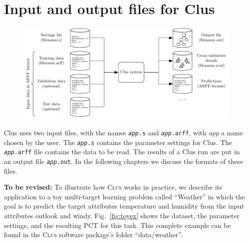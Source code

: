 \documentclass[a4paper]{report}
\newcommand{\clus}{\textsc{Clus}}
\begin{document}
\section{Input and output files for Clus}

\begin{figure}
\includegraphics{fig/clusinout}
\end{figure}

Clus uses two input files, with the names {\tt {\em app}.s} and {\tt {\em app}.arff}, with {\em app} a name chosen by the user.  The {\tt {\em app}.s} contains the parameter settings for Clus.  The {\tt {\em app}.arff} file contains the data to be read.  The results of a Clus run are put in an output file {\tt {\em app}.out}.  In the following chapters we discuss the formats of these files.

\textbf{To be revised:} To illustrate how \clus{} works in practice, we describe its application to a toy multi-target learning problem called ``Weather'' in which the goal is to predict the target attributes temperature and humidity from the input attributes outlook and windy. Fig.~\ref{fig:toyex} shows the dataset, the parameter settings, and the resulting PCT for this task. This complete example can be found in the \clus{} software package's folder ``data/weather''.
\end{document}
